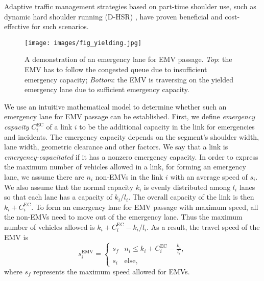 Adaptive traffic management strategies based on part-time shoulder use, such as dynamic hard shoulder running (D-HSR) \cite{Jiaqi2016Dynamic}, have proven beneficial and cost-effective for such scenarios. 

\begin{figure}[ht]
\texttt{[image: images/fig\_yielding.jpg]}
\centering
\caption{A demonstration of an emergency lane for EMV passage. \emph{Top}: the EMV has to follow the congested queue due to insufficient emergency capacity;
\emph{Bottom}: the EMV is traversing on the yielded emergency lane due to sufficient emergency capacity.}
\label{fig_yielding}
\end{figure}

We use an intuitive mathematical model to determine whether such an emergency lane for EMV passage can be established. 
First, we define \emph{emergency capacity} $C_{i}^{\textrm{EC}}$ of a link $i$ to be the additional capacity in the link for emergencies and incidents. The emergency capacity depends on the segment's shoulder width, lane width, geometric clearance and other factors. We say that a link is \emph{emergency-capacitated} if it has a nonzero emergency capacity.
In order to express the maximum number of vehicles allowed in a link, for forming an emergency lane, we assume there are $n_i$ non-EMVs in the link $i$ with an average speed of $s_i$. We also assume that the normal capacity $k_i$ is evenly distributed among $l_i$ lanes so that each lane has a capacity of $k_i/l_i$. 
The overall capacity of the link is then $k_i + C_{i}^{\textrm{EC}}$. 
To form an emergency lane for EMV passage with maximum speed, all the non-EMVs need to move out of the emergency lane. Thus the maximum number of vehicles allowed is $k_i + C_{i}^{\textrm{EC}}- k_i/l_i$. As a result, the travel speed of the EMV is 
\begin{equation}\label{eqn:EMV_speed}
s_{i}^{\textrm{EMV}} = \begin{cases}
s_{f} & n_{i} \leq k_{i} + C_{i}^{\textrm{EC}} - \frac{k_i}{l_i},\\
s_{i} & \textrm{else,}
\end{cases}
\end{equation}
where $s_{f}$ represents the maximum speed allowed for EMVs.
% 



